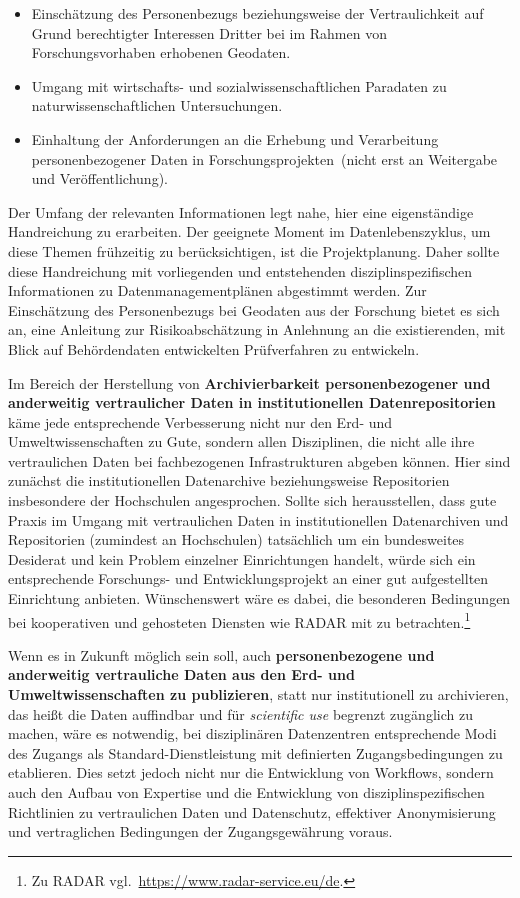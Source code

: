 \documentclass[a4paper,
fontsize=11pt,
oneside,
numbers=noperiodatend,
parskip=half-,
bibliography=totoc,
final
]{scrartcl}
\begin{document}
\begin{itemize}
\item
  Einschätzung des Personenbezugs beziehungsweise der Vertraulichkeit
  auf Grund berechtigter Interessen Dritter bei im Rahmen von
  Forschungsvorhaben erhobenen Geodaten.
\item
  Umgang mit wirtschafts- und sozialwissenschaftlichen Paradaten zu
  naturwissenschaftlichen Untersuchungen.
\item
  Einhaltung der Anforderungen an die Erhebung und Verarbeitung
  personenbezogener Daten in Forschungsprojekten~(nicht erst an
  Weitergabe und Veröffentlichung).
\end{itemize}

Der Umfang der relevanten Informationen legt nahe, hier eine
eigenständige Handreichung zu erarbeiten. Der geeignete Moment im
Datenlebenszyklus, um diese Themen frühzeitig zu berücksichtigen, ist
die Projektplanung. Daher sollte diese Handreichung mit vorliegenden und
entstehenden disziplinspezifischen Informationen zu
Datenmanagementplänen abgestimmt werden. Zur Einschätzung des
Personenbezugs bei Geodaten aus der Forschung bietet es sich an, eine
Anleitung zur Risikoabschätzung in Anlehnung an die existierenden, mit
Blick auf Behördendaten entwickelten Prüfverfahren zu entwickeln.

Im Bereich der Herstellung von \textbf{Archivierbarkeit
personenbezogener und anderweitig vertraulicher Daten in
institutionellen Datenrepositorien} käme jede entsprechende Verbesserung
nicht nur den Erd- und Umweltwissenschaften zu Gute, sondern allen
Disziplinen, die nicht alle ihre vertraulichen Daten bei fachbezogenen
Infrastrukturen abgeben können. Hier sind zunächst die institutionellen
Datenarchive beziehungsweise Repositorien insbesondere der Hochschulen
angesprochen. Sollte sich herausstellen, dass gute Praxis im Umgang mit
vertraulichen Daten in institutionellen Datenarchiven und Repositorien
(zumindest an Hochschulen) tatsächlich um ein bundesweites Desiderat und
kein Problem einzelner Einrichtungen handelt, würde sich ein
entsprechende Forschungs- und Entwicklungsprojekt an einer gut
aufgestellten Einrichtung anbieten. Wünschenswert wäre es dabei, die
besonderen Bedingungen bei kooperativen und gehosteten Diensten wie
RADAR mit zu betrachten.\footnote{Zu RADAR
  vgl.~\url{https://www.radar-service.eu/de}.}

Wenn es in Zukunft möglich sein soll, auch \textbf{personenbezogene und
anderweitig vertrauliche Daten aus den Erd- und Umweltwissenschaften zu
publizieren}, statt nur institutionell zu archivieren, das heißt die
Daten auffindbar und für \emph{scientific use} begrenzt zugänglich zu
machen, wäre es notwendig, bei disziplinären Datenzentren entsprechende
Modi des Zugangs als Standard-Dienstleistung mit definierten
Zugangsbedingungen zu etablieren. Dies setzt jedoch nicht nur die
Entwicklung von Workflows, sondern auch den Aufbau von Expertise und die
Entwicklung von disziplinspezifischen Richtlinien zu vertraulichen Daten
und Datenschutz, effektiver Anonymisierung und vertraglichen Bedingungen
der Zugangsgewährung voraus.
\end{document}
